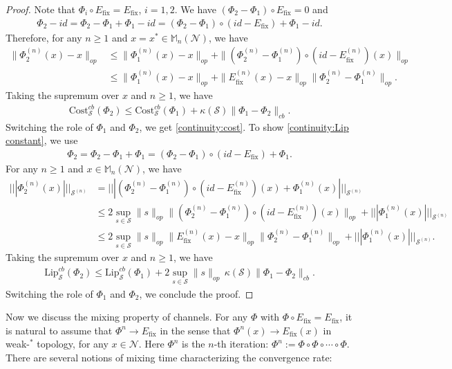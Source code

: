 \documentclass[11pt,reqno]{amsart}
\numberwithin{equation}{section}
\newcommand{\mb}{\mathbb}
\newcommand{\mc}{\mathcal}
\newcommand{\Lip}{\mathrm{Lip}}
\newcommand{\Cost}{\mathrm{Cost}}
\newcommand{\fix}{\mathrm{fix}}
\begin{document}
\begin{proof}
Note that $\Phi_i\circ E_{\fix} = E_{\fix}$, $i=1,2$. We have $(\Phi_2 - \Phi_1)\circ E_{\fix}=0$ and
\begin{align*}
\Phi_2 - id = \Phi_2 - \Phi_1 +\Phi_1 - id = (\Phi_2 - \Phi_1)\circ (id-E_{\fix}) +\Phi_1 - id.
\end{align*}
Therefore, for any $n \ge 1$ and $x=x^* \in \mb M_n(\mc N)$, we have 
\begin{align*}
    \|\Phi^{(n)}_2(x) - x\|_{op} & \le \|\Phi_1^{(n)}(x) - x\|_{op} + \|(\Phi^{(n)}_2 - \Phi^{(n)}_1)\circ (id-E^{(n)}_{\fix})(x)\|_{op} \\
    & \le \|\Phi_1^{(n)}(x) - x\|_{op} + \|E^{(n)}_{\fix}(x) - x\|_{op} \|\Phi^{(n)}_2 - \Phi^{(n)}_1\|_{op}.
\end{align*}
Taking the supremum over $x$ and $n\ge 1$, we have
\begin{align*}
    \Cost^{cb}_{\mc S}(\Phi_2) \le \Cost^{cb}_{\mc S}(\Phi_1) + \kappa(\mc S) \|\Phi_1-\Phi_2\|_{cb}.
\end{align*}
Switching the role of $\Phi_1$ and $\Phi_2$, we get \eqref{continuity:cost}. To show \eqref{continuity:Lip constant}, we use 
\begin{align*}
    \Phi_2 = \Phi_2 - \Phi_1 +\Phi_1 = (\Phi_2 - \Phi_1)\circ (id-E_{\fix}) +\Phi_1. 
\end{align*}
For any $n \ge 1$ and $x \in \mb M_n(\mc N)$, we have 
\begin{align*}
    |||\Phi_2^{(n)}(x)|||_{\mc S^{(n)}} & = |||(\Phi_2^{(n)} - \Phi_1^{(n)})\circ (id - E_\fix^{(n)})(x) + \Phi_1^{(n)}(x) |||_{\mc S^{(n)}} \\
    & \le 2 \sup_{s\in \mc S}\|s\|_{op} \|(\Phi_2^{(n)} - \Phi_1^{(n)})\circ (id - E_\fix^{(n)})(x) \|_{op} + |||\Phi_1^{(n)}(x)|||_{\mc S^{(n)}} \\
    & \le 2 \sup_{s\in \mc S}\|s\|_{op} \|E^{(n)}_{\fix}(x) - x\|_{op} \|\Phi^{(n)}_2 - \Phi^{(n)}_1\|_{op} + |||\Phi_1^{(n)}(x)|||_{\mc S^{(n)}}.
\end{align*}
Taking the supremum over $x$ and $n\ge 1$, we have
\begin{align*}
    \Lip^{cb}_{\mc S}(\Phi_2) \le \Lip^{cb}_{\mc S}(\Phi_1) + 2 \sup_{s\in \mc S}\|s\|_{op}\, \kappa(\mc S) \|\Phi_1-\Phi_2\|_{cb}.
\end{align*}
Switching the role of $\Phi_1$ and $\Phi_2$, we conclude the proof.
\end{proof}
Now we discuss the mixing property of channels. For any $\Phi$ with $\Phi\circ E_{\fix} = E_{\fix}$, it is natural to assume that $\Phi^n \to E_{\fix}$ in the sense that $\Phi^n(x) \to E_{\fix}(x)$ in weak-$^*$ topology, for any $x \in \mc N$. Here $\Phi^n$ is the $n$-th iteration: $\Phi^n:= \Phi \circ \Phi \circ \cdots \circ \Phi$. There are several notions of mixing time characterizing the convergence rate:
\end{document}
